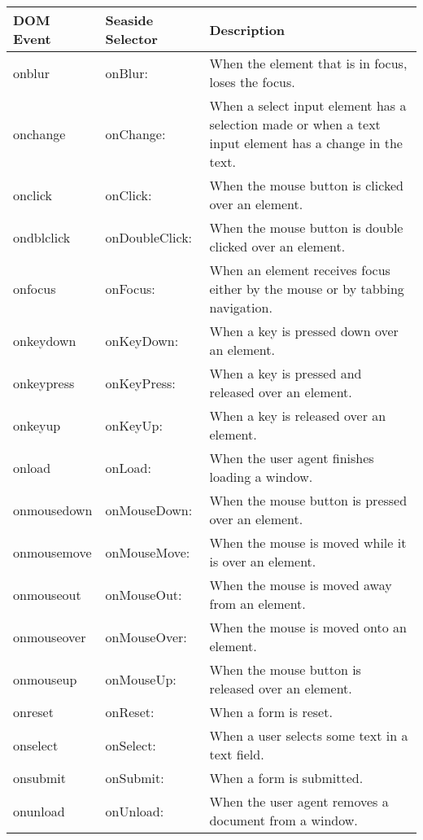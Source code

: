 \documentclass[a4paper,10pt,twoside]{book}
\newcommand{\ct}[1]{{\small\ttfamily\textup{#1}}}
\begin{document}
\begin{tabularx}{\textwidth}{llX}
\textbf{DOM Event }&\textbf{Seaside Selector }&\textbf{Description}\\ \hline
 onblur & \index{WATagBrush!onBlur:} \ct{onBlur:} & When the element that is in focus, loses the focus.\\
 onchange & \index{WATagBrush!onChange:} \ct{onChange:} & When a select input element has a selection made or when a text input element has a change in the text.\\
 onclick & \index{WATagBrush!onClick:} \ct{onClick:} & When the mouse button is clicked over an element.\\
 ondblclick & \index{WATagBrush!onDoubleClick:} \ct{onDoubleClick:} & When the mouse button is double clicked over an element.\\
 onfocus & \index{WATagBrush!onFocus:} \ct{onFocus:} & When an element receives focus either by the mouse or by tabbing navigation.\\
 onkeydown & \index{WATagBrush!onKeyDown:} \ct{onKeyDown:} & When a key is pressed down over an element.\\
 onkeypress & \index{WATagBrush!onKeyPress:} \ct{onKeyPress:} & When a key is pressed and released over an element.\\
 onkeyup & \index{WATagBrush!onKeyUp:} \ct{onKeyUp:} & When a key is released over an element.\\
 onload & \index{WATagBrush!onLoad:} \ct{onLoad:} & When the user agent finishes loading a window.\\
 onmousedown & \index{WATagBrush!onMouseDown:} \ct{onMouseDown:} & When the mouse button is pressed over an element.\\
 onmousemove & \index{WATagBrush!onMouseMove:} \ct{onMouseMove:} & When the mouse is moved while it is over an element.\\
 onmouseout & \index{WATagBrush!onMouseOut:} \ct{onMouseOut:} & When the mouse is moved away from an element.\\
 onmouseover & \index{WATagBrush!onMouseOver:} \ct{onMouseOver:} & When the mouse is moved onto an element.\\
 onmouseup & \index{WATagBrush!onMouseUp:} \ct{onMouseUp:} & When the mouse button is released over an element.\\
 onreset & \index{WATagBrush!onReset:} \ct{onReset:} & When a form is reset.\\
 onselect & \index{WATagBrush!onSelect:} \ct{onSelect:} & When a user selects some text in a text field.\\
 onsubmit & \index{WATagBrush!onSubmit:} \ct{onSubmit:} & When a form is submitted.\\
 onunload & \index{WATagBrush!onUnload:} \ct{onUnload:} & When the user agent removes a document from a window.\\
\end{tabularx}
\end{document}
